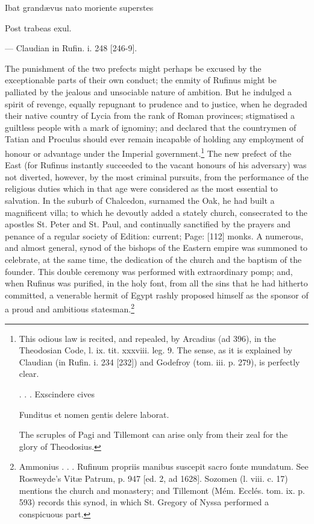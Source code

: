 {Ibat grandævus nato moriente superstes

Post trabeas exul.

\texthebrew{—} Claudian in Rufin. i. 248 [246-9].} The punishment of the two prefects might perhaps be excused by the exceptionable parts of their own conduct; the enmity of Rufinus might be palliated by the jealous and unsociable nature of ambition. But he indulged a spirit of revenge, equally repugnant to prudence and to justice, when he degraded their native country of Lycia from the rank of Roman provinces; stigmatised a guiltless people with a mark of ignominy; and declared that the countrymen of Tatian and Proculus should ever remain incapable of holding any employment of honour or advantage under the Imperial government.\footnote{This odious law is recited, and repealed, by Arcadius (ad 396), in the Theodosian Code, l. ix. tit. xxxviii. leg. 9. The sense, as it is explained by Claudian (in Rufin. i. 234 [232]) and Godefroy (tom. iii. p. 279), is perfectly clear.

. . . Exscindere cives

Funditus et nomen gentis delere laborat.

The scruples of Pagi and Tillemont can arise only from their zeal for the glory of Theodosius.} The new prefect of the East (for Rufinus instantly succeeded to the vacant honours of his adversary) was not diverted, however, by the most criminal pursuits, from the performance of the religious duties which in that age were considered as the most essential to salvation. In the suburb of Chalcedon, surnamed the Oak, he had built a magnificent villa; to which he devoutly added a stately church, consecrated to the apostles St. Peter and St. Paul, and continually sanctified by the prayers and penance of a regular society of Edition: current; Page: [112] monks. A numerous, and almost general, synod of the bishops of the Eastern empire was summoned to celebrate, at the same time, the dedication of the church and the baptism of the founder. This double ceremony was performed with extraordinary pomp; and, when Rufinus was purified, in the holy font, from all the sins that he had hitherto committed, a venerable hermit of Egypt rashly proposed himself as the sponsor of a proud and ambitious statesman.\footnote{Ammonius . . . Rufinum propriis manibus suscepit sacro fonte mundatum. See Rosweyde\texthebrew{}’s Vitæ Patrum, p. 947 [ed. 2, ad 1628]. Sozomen (l. viii. c. 17) mentions the church and monastery; and Tillemont (Mém. Ecclés. tom. ix. p. 593) records this synod, in which St. Gregory of Nyssa performed a conspicuous part.}


